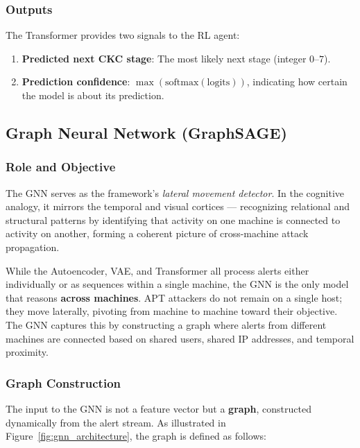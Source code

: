 \subsubsection{Outputs}

The Transformer provides two signals to the RL agent:
\begin{enumerate}
    \item \textbf{Predicted next CKC stage}: The most likely next stage (integer $0$--$7$).
    \item \textbf{Prediction confidence}: $\max(\text{softmax}(\text{logits}))$, indicating how certain the model is about its prediction.
\end{enumerate}


\subsection{Graph Neural Network (GraphSAGE)}
\label{subsec:gnn}

\subsubsection{Role and Objective}

The GNN serves as the framework's \textit{lateral movement detector}. In the cognitive analogy, it mirrors the temporal and visual cortices --- recognizing relational and structural patterns by identifying that activity on one machine is connected to activity on another, forming a coherent picture of cross-machine attack propagation.

While the Autoencoder, VAE, and Transformer all process alerts either individually or as sequences within a single machine, the GNN is the only model that reasons \textbf{across machines}. APT attackers do not remain on a single host; they move laterally, pivoting from machine to machine toward their objective. The GNN captures this by constructing a graph where alerts from different machines are connected based on shared users, shared IP addresses, and temporal proximity.

\subsubsection{Graph Construction}

The input to the GNN is not a feature vector but a \textbf{graph}, constructed dynamically from the alert stream. As illustrated in Figure~\ref{fig:gnn_architecture}, the graph is defined as follows:

